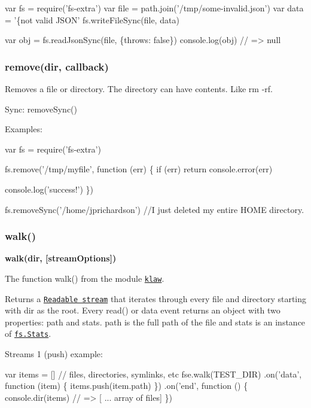 \begin{DoxyCode}
var fs = require('fs-extra')
var file = path.join('/tmp/some-invalid.json')
var data = '\{not valid JSON'
fs.writeFileSync(file, data)

var obj = fs.readJsonSync(file, \{throws: false\})
console.log(obj) // => null
\end{DoxyCode}


\subsubsection*{remove(dir, callback)}

Removes a file or directory. The directory can have contents. Like {\ttfamily rm -\/rf}.

Sync\+: {\ttfamily remove\+Sync()}

Examples\+:


\begin{DoxyCode}
var fs = require('fs-extra')

fs.remove('/tmp/myfile', function (err) \{
  if (err) return console.error(err)

  console.log('success!')
\})

fs.removeSync('/home/jprichardson') //I just deleted my entire HOME directory.
\end{DoxyCode}


\subsubsection*{walk()}

{\bfseries walk(dir, \mbox{[}stream\+Options\mbox{]})}

The function {\ttfamily walk()} from the module \href{https://github.com/jprichardson/node-klaw}{\tt {\ttfamily klaw}}.

Returns a \href{https://nodejs.org/api/stream.html#stream_class_stream_readable}{\tt Readable stream} that iterates through every file and directory starting with {\ttfamily dir} as the root. Every {\ttfamily read()} or {\ttfamily data} event returns an object with two properties\+: {\ttfamily path} and {\ttfamily stats}. {\ttfamily path} is the full path of the file and {\ttfamily stats} is an instance of \href{https://nodejs.org/api/fs.html#fs_class_fs_stats}{\tt fs.\+Stats}.

Streams 1 (push) example\+:


\begin{DoxyCode}
var items = [] // files, directories, symlinks, etc
fse.walk(TEST\_DIR)
  .on('data', function (item) \{
    items.push(item.path)
  \})
  .on('end', function () \{
    console.dir(items) // => [ ... array of files]
  \})
\end{DoxyCode}


